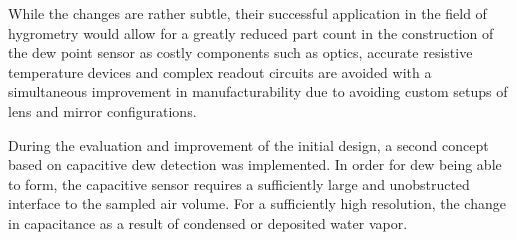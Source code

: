 While the changes are rather subtle, their successful application in the field of hygrometry would allow for a greatly reduced part count in the construction of the dew point sensor as costly components such as optics, accurate resistive temperature devices and complex readout circuits are avoided with a simultaneous improvement in manufacturability due to avoiding custom setups of lens and mirror configurations.

During the evaluation and improvement of the initial design, a second concept based on capacitive dew detection was implemented. In order for dew being able to form, the capacitive sensor requires a sufficiently large and unobstructed interface to the sampled air volume. For a sufficiently high resolution, the change in capacitance as a result of condensed or deposited water vapor.




